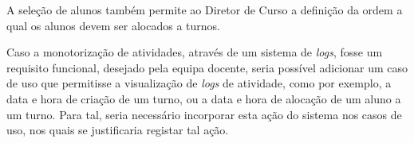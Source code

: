 \documentclass[a4paper,12pt]{scrreprt}
\begin{document}
A seleção de alunos também permite ao Diretor de Curso a definição da ordem
a qual os alunos devem ser alocados a turnos.

\vspace{1cm}

Caso a monotorização de atividades, através de um sistema de \textit{logs}, fosse um requisito funcional,
desejado pela equipa docente, seria possível adicionar um caso de uso que permitisse a visualização
de \textit{logs} de atividade, como por exemplo, a data e hora de criação de um turno,
ou a data e hora de alocação de um aluno a um turno. Para tal, seria necessário
incorporar esta ação do sistema nos casos de uso, nos quais se justificaria registar tal ação.




%
%


\end{document}
